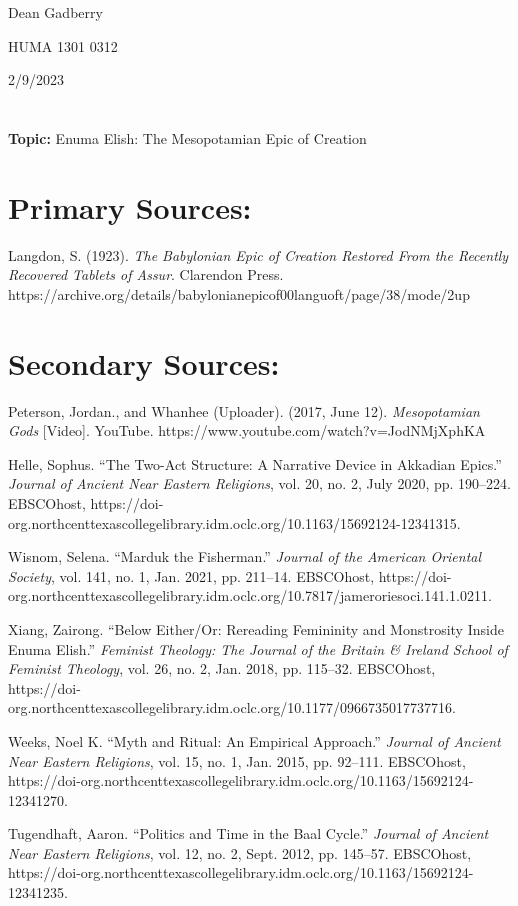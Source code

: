 \documentclass[12pt,a4paper,english]{article}
\begin{document}
\sloppy
Dean Gadberry
\par
HUMA 1301 0312
\par
2/9/2023

\section*{}
\textbf{Topic:}
Enuma Elish: The Mesopotamian Epic of Creation

\section*{Primary Sources:}
\begin{hangparas}{2em}{1}
  Langdon, S. (1923). \emph{The Babylonian Epic of Creation Restored From the Recently Recovered Tablets of Assur}. Clarendon Press. https://archive.org/details/babylonianepicof00languoft/page/38/mode/2up
  \par
\end{hangparas}
\hfill

\section*{Secondary Sources:}
\begin{hangparas}{2em}{1}
  Peterson, Jordan., and Whanhee (Uploader). (2017, June 12). \emph{Mesopotamian Gods} [Video]. YouTube. https://www.youtube.com/watch?v=JodNMjXphKA
  \par
  Helle, Sophus. “The Two-Act Structure: A Narrative Device in Akkadian Epics.” \emph{Journal of Ancient Near Eastern Religions}, vol. 20, no. 2, July 2020, pp. 190–224. EBSCOhost, https://doi-org.northcenttexascollegelibrary.idm.oclc.org/10.1163/15692124-12341315.
  \par
Wisnom, Selena. “Marduk the Fisherman.” \emph{Journal of the American Oriental Society}, vol. 141, no. 1, Jan. 2021, pp. 211–14. EBSCOhost, https://doi-org.northcenttexascollegelibrary.idm.oclc.org/10.7817/jameroriesoci.141.1.0211.
  \par
  Xiang, Zairong. “Below Either/Or: Rereading Femininity and Monstrosity Inside Enuma Elish.” \emph{Feminist Theology: The Journal of the Britain & Ireland School of Feminist Theology}, vol. 26, no. 2, Jan. 2018, pp. 115–32. EBSCOhost, https://doi-org.northcenttexascollegelibrary.idm.oclc.org/10.1177/0966735017737716.
  \par
  Weeks, Noel K. “Myth and Ritual: An Empirical Approach.” \emph{Journal of Ancient Near Eastern Religions}, vol. 15, no. 1, Jan. 2015, pp. 92–111. EBSCOhost, https://doi-org.northcenttexascollegelibrary.idm.oclc.org/10.1163/15692124-12341270.
  \par
Tugendhaft, Aaron. “Politics and Time in the Baal Cycle.” \emph{Journal of Ancient Near Eastern Religions}, vol. 12, no. 2, Sept. 2012, pp. 145–57. EBSCOhost, https://doi-org.northcenttexascollegelibrary.idm.oclc.org/10.1163/15692124-12341235.
\end{hangparas}
\hfill
\end{document}

